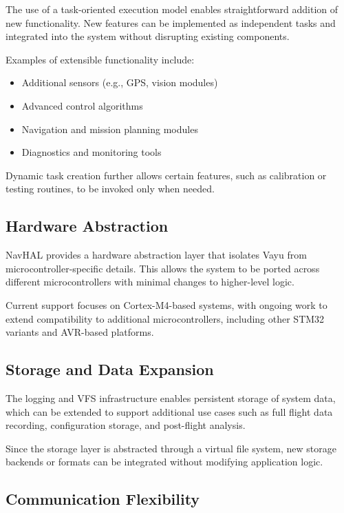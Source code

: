 The use of a task-oriented execution model enables straightforward addition of new functionality. New features can be implemented as independent tasks and integrated into the system without disrupting existing components.

Examples of extensible functionality include:
\begin{itemize}
    \item Additional sensors (e.g., GPS, vision modules)
    \item Advanced control algorithms
    \item Navigation and mission planning modules
    \item Diagnostics and monitoring tools
\end{itemize}

Dynamic task creation further allows certain features, such as calibration or testing routines, to be invoked only when needed.

\subsection{Hardware Abstraction}

NavHAL provides a hardware abstraction layer that isolates Vayu from microcontroller-specific details. This allows the system to be ported across different microcontrollers with minimal changes to higher-level logic.

Current support focuses on Cortex-M4-based systems, with ongoing work to extend compatibility to additional microcontrollers, including other STM32 variants and AVR-based platforms.

\subsection{Storage and Data Expansion}

The logging and VFS infrastructure enables persistent storage of system data, which can be extended to support additional use cases such as full flight data recording, configuration storage, and post-flight analysis.

Since the storage layer is abstracted through a virtual file system, new storage backends or formats can be integrated without modifying application logic.

\subsection{Communication Flexibility}

